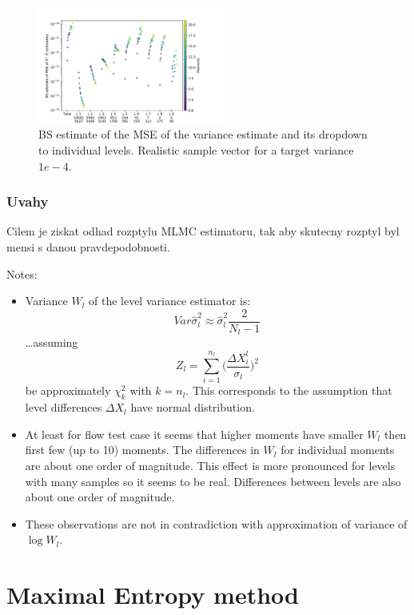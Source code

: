 \documentclass{article}
\def\vc#1{\mathbf{\boldsymbol{#1}}}     %
\begin{document}
\begin{figure}
 \includegraphics[width=0.55\textwidth]{bs_var_var_composition.pdf}
 \caption{BS estimate of the MSE of the variance estimate and its dropdown to individual levels. Realistic sample vector for a target variance $1e-4$.}
 \label{fig:bs_var_var_comp}
\end{figure}


\subsubsection{Uvahy}
Cilem je ziskat odhad rozptylu MLMC estimatoru, tak aby skutecny rozptyl byl mensi s danou pravdepodobnosti. 

Notes:
\begin{itemize}
    \item Variance $W_l$ of the level variance estimator is:
    \[
        Var \hat\sigma_l^2 \approx \hat\sigma_l^2 \frac{2}{N_l - 1}
    \]
    \dots assuming
    \[
    Z_l = \sum_{i=1}^{n_l}\Big(\frac{\Delta X^l_i}{\sigma_l}\Big)^2
    \]
    be approximately $\chi^2_k$ with $k=n_l$. This corresponds to the assumption that level differences $\Delta X_l$ have normal distribution. 
    \item At least for flow test case it seems that higher moments have smaller $W_l$ then first few (up to 10) moments. The differences in $W_l$ for individual moments are about one order of magnitude.  This effect is more pronounced for levels with many samples so it seems to be real. Differences between levels are also about one order of magnitude.
    \item These observations are not in contradiction with approximation of variance of  $\log W_l$.
\end{itemize}


\section{Maximal Entropy method}
\def\vl{{\vc\lambda}}
\def\estvl{{\vc{\hat\lambda}}}
\def\estrho{\hat\rho}
\def\vmu{\vc\mu}
\def\estvmu{{\vc{\hat\mu}}}
\def\vphi{\vc\phi}
\end{document}
